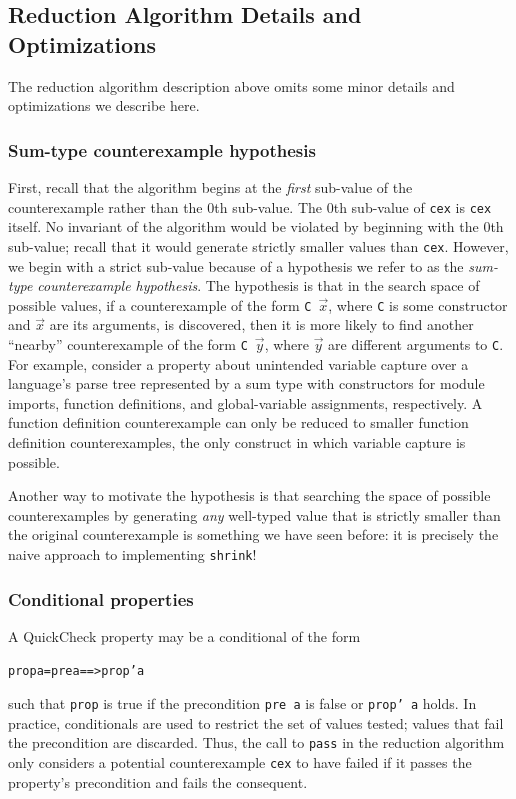 \documentclass[10pt]{sigplanconf}
\newenvironment{code}{\begin{alltt}}{\end{alltt}}
\newcommand{\ttp}[1]{\texttt{#1}}
\begin{document}
\subsection{Reduction Algorithm Details and Optimizations}
The reduction algorithm description above omits some minor details and
optimizations we describe here.

\subsubsection{Sum-type counterexample hypothesis}
First, recall that the algorithm begins at the \emph{first} sub-value of the
counterexample rather than the 0th sub-value.  The 0th sub-value of \ttp{cex} is
\ttp{cex} itself.  No invariant of the algorithm would be violated by beginning
with the 0th sub-value; recall that it would generate strictly smaller values
than \ttp{cex}.  However, we begin with a strict sub-value because of a
hypothesis we refer to as the \emph{sum-type counterexample hypothesis}.  The
hypothesis is that in the search space of possible values, if a counterexample
of the form \ttp{C}~$\vec{x}$, where \ttp{C} is some constructor and $\vec{x}$
are its arguments, is discovered, then it is more likely to find another
``nearby'' counterexample of the form \ttp{C}~$\vec{y}$, where $\vec{y}$ are
different arguments to \ttp{C}.  For example, consider a property about
unintended variable capture over a language's parse tree represented by a sum
type with constructors for module imports, function definitions, and
global-variable assignments, respectively.  A function definition counterexample
can only be reduced to smaller function definition counterexamples, the only
construct in which variable capture is possible.

Another way to motivate the hypothesis is that searching the space of possible
counterexamples by generating \emph{any} well-typed value that is strictly
smaller than the original counterexample is something we have seen before: it is
precisely the naive approach to implementing \ttp{shrink}!

\subsubsection{Conditional properties}
A QuickCheck property may be a conditional of the form
%
\begin{code}
prop a = pre a ==> prop' a
\end{code}
%
\noindent
such that \ttp{prop} is true if the precondition \ttp{pre a} is false or
\ttp{prop' a} holds.  In practice, conditionals are used to restrict the set of
values tested; values that fail the precondition are discarded.  Thus, the call
to \ttp{pass} in the reduction algorithm only considers a potential
counterexample \ttp{cex} to have failed if it passes the property's
precondition and fails the consequent.
\end{document}
